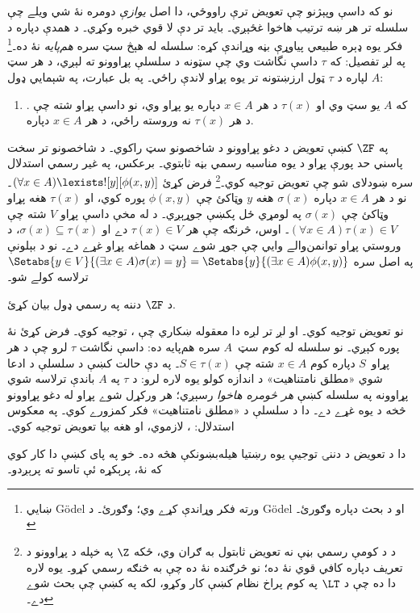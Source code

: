 \documentclass[../../../include/open-logic-section]{subfiles}
\begin{document}
نو که \stagesinex{} داسې وپېژنو چې تعويض ترې راووځي، دا اصل
\emph{يوازې} دومره نۀ شي ويلے چې سلسله تر هر ښه ترتيب هاخوا غځېږي۔
بايد تر دې لا قوي خبره وکړي۔ د همدې دپاره \cite{Shoenfield:AST} د
فکر يوه ډېره طبيعي پياوړې بڼه وړاندې کړه: سلسله له هېڅ سټ سره
\emph{هم‌پايه} نۀ ده۔\footnote{ښايي G\"odel ورته فکر وړاندې کړے وي؛
\citet[p.~223]{Potter2004} وګورئ۔ د G\"odel او
\citeauthor{Shoenfield:AST} د بحث دپاره \citet[90--5]{Incurvati2020}
وګورئ۔} په لږ تفصيل: که $\tau$ داسې نگاشت وي چې سټونه د سلسلې
پړاوونو ته لېږي، د هر سټ $A$ لپاره د $\tau$ ټول ارزښتونه
تر يوه پړاو لاندې راځي۔ په بل عبارت، په شېمايي ډول:
\begin{enumerate}
	\item[] \stagescofin. که $A$ يو سټ وي او $\tau(x)$ د هر
	$x \in A$ دپاره يو پړاو وي، نو داسې پړاو شته چې د هر
	$\tau(x)$ نه وروسته راځي، د هر $x \in A$ دپاره.
\end{enumerate}
په $\ZF$ کښې تعويض د دغو پړاوونو د شاخصونو سټ راکوي۔
د شاخصونو تر سخت پاسني حد پورې پړاو د \stagescofin
يوه مناسبه رسمي بڼه ثابتوي۔
برعکس، په غير رسمي استدلال سره ښودلای شو چې \stagescofin{} تعويض
توجيه کوي۔\footnote{د \stagescofin د کومې رسمي بڼې نه تعويض ثابتول
به ګران وي، ځکه $\Z$ په خپله د پړاوونو د تعريف دپاره کافي قوي نۀ
ده؛ نو څرګنده نۀ ده چې \stagescofin به څنګه رسمي کړو۔ يوه لاره دا
ده چې د $\LT$ په کوم پراخ نظام کښې کار وکړو، لکه په
 کښې چې بحث شوے دے۔}
فرض کړئ $(\forall x \in A)\lexists![y][\phi(x,y)]$۔ نو د هر
$x \in A$ دپاره $\sigma(x)$ هغه $y$ وټاکئ چې $\phi(x,y)$ پوره
کوي، او $\tau(x)$ هغه پړاو وټاکئ چې $\sigma(x)$ په لومړي ځل پکښې
جوړېږي۔ د \stagescofin له مخې داسې پړاو $V$ شته چې
$(\forall x \in A)\tau(x)\in V$۔ اوس، څرنګه چې هر
$\tau(x) \in V$ دے او $\sigma(x) \subseteq \tau(x)$، د
وروستي پړاو توانمن‌والے وايي چې جوړ شوے سټ د هماغه پړاو
غړے دے۔ نو د بېلونې په اصل سره
$\Setabs{y
\in V}{(\exists x \in A)\sigma(x) = y} = \Setabs{y}{(\exists x \in
A)\phi(x,y)}$ ترلاسه کولے شو۔

\begin{prob}
	\stagescofin{} د $\ZF$ دننه په رسمي ډول بيان کړئ.
\end{prob}

نو \stagescofin{} تعويض توجيه کوي۔ او لږ تر لږه دا معقوله ښکاري
چې \stagesinex{}، \stagescofin توجيه کوي۔ فرض کړئ \stagescofin{}
نۀ پوره کېږي۔ نو سلسله له کوم سټ~$A$ سره هم‌پايه ده: داسې نگاشت
$\tau$ لرو چې د هر پړاو~$S$ دپاره کوم $x \in A$ شته چې
$S \in \tau(x)$۔ په دې حالت کښې د سلسلې د ادعا شوي «مطلق نامتناهيت»
د اندازه کولو يوه لاره لرو: د $\tau$ په $A$ باندې
ترلاسه شوي پړاوونه په سلسله کښې \emph{هر څومره هاخوا}
رسېږي؛ هر ورکړل شوے پړاو له دغو پړاوونو څخه د يوه غړے دے۔ دا د سلسلې د «مطلق نامتناهيت» فکر کمزورے
کوي۔ په معکوس استدلال: \stagesinex{}، \stagescofin لازموي، او هغه
بيا تعويض توجيه کوي۔

دا د تعويض د دننۍ توجيې يوه رښتيا هيله‌بښونکې هڅه ده۔ خو په پای کښې
دا کار کوي که نۀ، پرېکړه ئې تاسو ته پرېږدو۔
\end{document}

